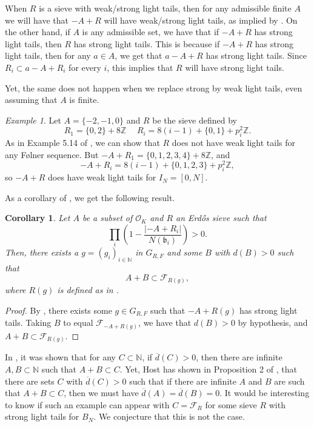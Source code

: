 \documentclass[a4paper,11pt,reqno]{amsart}
\theoremstyle{plain}
\newtheorem{corollary}[theorem]{Corollary}
\theoremstyle{remark}
\newtheorem{example}[theorem]{Example}
\newcommand{\z}{\mathbb{Z}}
\newcommand{\co}{\mathcal{O}}
\newcommand{\cf}{\mathcal{F}}
\newcommand{\fr}{\mathcal{F}_R}
\newcommand{\gb}{\mathfrak{b}}
\newcommand{\grf}{G_{R,F}}
\begin{document}
		
				
				When $R$ is a sieve with weak/strong light tails, then for any admissible finite $A$ we will have that $-A+R$ will have weak/strong light tails, as implied by . On the other hand, if $A$ is any admissible set, we have that if $-A+R$ has strong light tails, then $R$ has strong light tails. This is because if $-A+R$ has strong light tails, then for any $a \in A$, we get that $a-A+R$ has strong light tails. Since $R_i \subset a-A+R_i $ for every $i$, this implies that $R$ will have strong light tails. 
				
				Yet, the same does not happen when we replace strong by weak light tails, even assuming that $A$ is finite.
				
				\begin{example}
					Let $A = \{-2,-1,0\}$ and $R$ be the sieve defined by $$R_1 = \{0,2\}+8\z \hspace{15pt} R_i = 8(i-1) +\{0,1\}+p_i^2\z.$$ As in Example 5.14 of \cite{part1}, we can show that $R$ does not have weak light tails for any Følner sequence. But $-A+R_1 = \{0,1,2,3,4\} + 8\z$, and $$-A+R_i = 8(i-1)+\{0,1,2,3\}+p_i^2\z,$$ so $-A+R$ does have weak light tails for $I_N = [0,N]$.
				\end{example} 
				
				As a corollary of 	, we get the following result.
				
				\begin{corollary}
					\label{crl: A B subset of FR}
					Let $A$ be a subset of $\co_K$ and $R$ an Erdős sieve such that $$\prod_i \left(1-\frac{|-A+R_i|}{N(\gb_i)}\right) >0.$$ Then, there exists a $g = (g_i)_{i \in \mathbb{N}}$ in $\grf$ and some $B$ with $d(B)>0$ such that $$A+B \subset \cf_{R(g)},$$ where $R(g)$ is defined as in .
				\end{corollary}
				
				\begin{proof}
					By , there exists some $g\in\grf$ such that $-A+R(g)$ has strong light tails. Taking $B$ to equal $\cf_{-A+R(g)}$, we have that $d(B) >0$ by hypothesis, and $A+B \subset \cf_{R(g)}$. 
				\end{proof}
				
				In \cite{Moreira}, it was shown that for any $C\subset \mathbb{N}$, if $\overline{d}(C)>0$, then there are infinite $A,B \subset \mathbb{N}$ such that $A+B \subset C$. Yet, Host has shown in Proposition 2 of \cite{Host}, that there are sets $C$ with $\overline{d}(C)>0$ such that if there are infinite $A$ and $B$ are such that $A+B \subset C$, then we must have $\overline{d}(A) = \overline{d}(B) = 0$. It would be interesting to know if such an example can appear with $C = \fr$ for some sieve $R$ with strong light tails for $B_N$. We conjecture that this is not the case.
				
\end{document}
